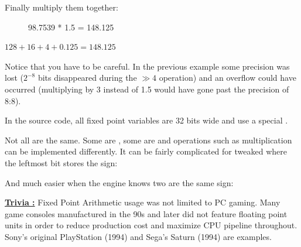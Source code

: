 Finally multiply them together:

\begin{figure}[H]
 \centering
   
   \caption{98.7539 * 1.5 = 148.125} 
\end{figure} 
$128 + 16 + 4 + 0.125 = 148.125 $\\
\par
Notice that you have to be careful. In the previous example some precision was lost ($ 2^{-8}$ bits disappeared during the $\gg 4$ operation) and an overflow could have occurred (multiplying by 3 instead of 1.5 would have gone past the precision of 8:8).\\
\par
In the source code, all fixed point variables are 32 bits wide and use a special .\\
\par
\begin{minipage}{\textwidth}
 
 \end{minipage}
\par
Not all  are the same. Some are , some are  and operations such as multiplication can be implemented differently. It can be fairly complicated for tweaked  where the leftmost bit stores the sign:\\
\par
\begin{minipage}{\textwidth}
 
 \end{minipage}
\par
And much easier when the engine knows two  are the same sign:\\

\par
\begin{minipage}{\textwidth}
 
 \end{minipage}
\par

 \textbf{\underline{Trivia :}}  Fixed Point Arithmetic usage was not limited to PC gaming. Many game consoles manufactured in the 90s and later did not feature floating point units in order to reduce production cost and maximize CPU pipeline throughout. Sony's original PlayStation (1994) and Sega's Saturn (1994) are examples.
 

 
 


